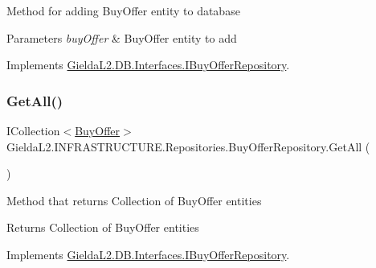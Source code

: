 Method for adding Buy\+Offer entity to database 


\begin{DoxyParams}{Parameters}
{\em buy\+Offer} & Buy\+Offer entity to add\\
\hline
\end{DoxyParams}


Implements \mbox{\hyperlink{interface_gielda_l2_1_1_d_b_1_1_interfaces_1_1_i_buy_offer_repository_aae66f2818cb5476f701c68266e413d87}{Gielda\+L2.\+D\+B.\+Interfaces.\+I\+Buy\+Offer\+Repository}}.

\mbox{\label{class_gielda_l2_1_1_i_n_f_r_a_s_t_r_u_c_t_u_r_e_1_1_repositories_1_1_buy_offer_repository_ab0ce549916d7e0cd138454a9768ed7c5}} 
\subsubsection{\texorpdfstring{GetAll()}{GetAll()}}
{\footnotesize\ttfamily I\+Collection$<$\mbox{\hyperlink{class_gielda_l2_1_1_d_b_1_1_entities_1_1_buy_offer}{Buy\+Offer}}$>$ Gielda\+L2.\+I\+N\+F\+R\+A\+S\+T\+R\+U\+C\+T\+U\+R\+E.\+Repositories.\+Buy\+Offer\+Repository.\+Get\+All (\begin{DoxyParamCaption}{ }\end{DoxyParamCaption})}



Method that returns Collection of Buy\+Offer entities 

\begin{DoxyReturn}{Returns}
Collection of Buy\+Offer entities
\end{DoxyReturn}


Implements \mbox{\hyperlink{interface_gielda_l2_1_1_d_b_1_1_interfaces_1_1_i_buy_offer_repository_aa086036b9ec0331e455c846193679851}{Gielda\+L2.\+D\+B.\+Interfaces.\+I\+Buy\+Offer\+Repository}}.

\mbox{\label{class_gielda_l2_1_1_i_n_f_r_a_s_t_r_u_c_t_u_r_e_1_1_repositories_1_1_buy_offer_repository_adf2f5395c33786befc29d371aecee31d}} 

